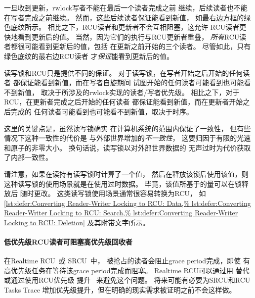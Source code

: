 \QuickQuizEnd

一旦收到更新，rwlock写者不能在最后一个读者完成之前
继续，后续读者也不能在写者完成之前继续。
然而，这些后续读者保证能看到新值，
如最右边方框的绿色底纹所示。
相比之下，RCU读者和更新者不会互相阻塞，这允许
RCU读者更快地看到更新后的值。
当然，因为它们的执行与RCU更新者重叠，
\emph{所有}RCU读者都很可能看到更新后的值，包括
在更新之前开始的三个读者。
尽管如此，只有绿色底纹的最右边RCU读者
才\emph{保证}能看到更新后的值。

读写锁和RCU只是提供不同的保证。
对于读写锁，在写者开始之后开始的任何读者
都保证能看到新值，而在写者自旋期间
试图开始的任何读者可能看到也可能看不到新值，
取决于所涉及的rwlock实现的读者/写者优先级。
相比之下，对于RCU，在更新者完成之后开始的任何读者
都保证能看到新值，而在更新者开始之后完成的
任何读者可能看到也可能看不到新值，取决于时序。

这里的关键点是，虽然读写锁确实
在计算机系统的范围内保证了一致性，
但有些情况下这种一致性的代价是
与外部世界增加的\emph{不一致性}，
这要归因于有限的光速和原子的非零大小。
换句话说，读写锁以对外部世界数据的
无声过时为代价获取了内部一致性。

请注意，如果在读持有读写锁时计算了一个值，
然后在释放该锁后使用该值，则
这种读写锁的使用场景就是在使用过时数据。
毕竟，该值所基于的量可以在锁释放后
随时更改。
这类读写锁使用场景通常很容易转换为RCU，
如\cref{lst:defer:Converting Reader-Writer Locking to RCU: Data,%
lst:defer:Converting Reader-Writer Locking to RCU: Search,%
lst:defer:Converting Reader-Writer Locking to RCU: Deletion}
及其附带文字所示。

\paragraph{低优先级RCU读者可阻塞高优先级回收者}

在Realtime RCU~\cite{DinakarGuniguntala2008IBMSysJ}或
SRCU~\cite{PaulEMcKenney2006c}中，
被抢占的读者会阻止grace period完成，即使
有高优先级任务在等待该grace period完成而阻塞。
Realtime RCU可以通过用
替代或通过使用RCU优先级
提升~\cite{PaulEMcKenney2007BoostRCU,DinakarGuniguntala2008IBMSysJ}
来避免这个问题。
将来可能有必要为SRCU和RCU Tasks Trace
增加优先级提升，但在明确的现实需求被证明之前不会这样做。

